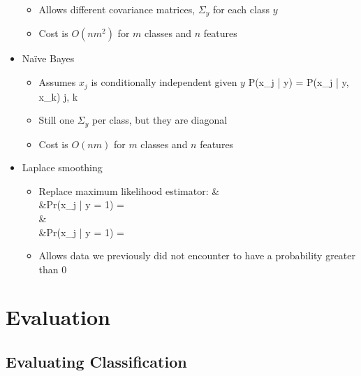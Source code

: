 \documentclass[12pt]{article}
\newenvironment{eqn}{\equation\alignedat{3}}{\endalignedat\endequation}
\begin{document}
\begin{itemize}
	\begin{itemize}
		\item Allows different covariance matrices, $\Sigma_y$ for each class $y$
		\item Cost is $O(nm^2)$ for $m$ classes and $n$ features
	\end{itemize}
	\item Naïve Bayes 
	\begin{itemize}
		\item Assumes $x_j$ is conditionally independent given $y$ 
		\begin{eqn}
			P(x_j | y) = P(x_j | y, x_k) \forall j, k
		\end{eqn}
		\item Still one $\Sigma_y$ per class, but they are diagonal
		\item Cost is $O(nm)$ for $m$ classes and $n$ features
	\end{itemize}
	\item Laplace smoothing
	\begin{itemize}
		\item Replace maximum likelihood estimator:
		\begin{eqn}
			& \\
			&Pr(x_j | y = 1) =  \\
			& \\
			&Pr(x_j | y = 1) = 
		\end{eqn}
		\item Allows data we previously did not encounter to have a probability greater than 0
	\end{itemize}
\end{itemize}

\section{Evaluation}

\subsection{Evaluating Classification}
\end{document}

